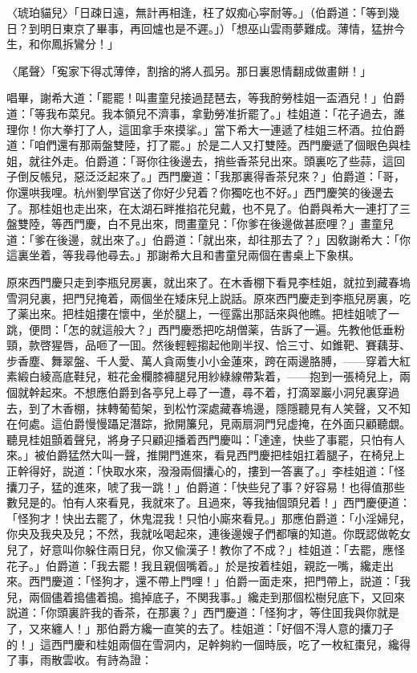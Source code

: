 〈琥珀貓兒〉「日疎日遠，無計再相逢，枉了奴痴心寜耐等。」（伯爵道：「等到幾日？到明日東京了畢事，再回爐也是不遲。」）「想巫山雲雨夢難成。薄情，猛拚今生，和你鳳拆鸞分！」

〈尾聲〉「寃家下得忒薄倖，割捨的將人孤另。那日裏恩情翻成做畫餅！」

唱畢，謝希大道：「罷罷！叫畫童兒接過琵琶去，等我酧勞桂姐一盃酒兒！」伯爵道：「等我布菜兒。我本領兒不濟事，拿勤勞准折罷了。」桂姐道：「花子過去，誰理你！你大拳打了人，這囬拿手來摸挲。」當下希大一連遞了桂姐三杯酒。拉伯爵道：「咱們還有那兩盤雙陸，打了罷。」於是二人又打雙陸。西門慶遞了個眼色與桂姐，就往外走。伯爵道：「哥你往後邊去，捎些香茶兒出來。頭裏吃了些蒜，這回子倒反帳兒，惡泛泛起來了。」西門慶道：「我那裏得香茶兒來？」伯爵道：「哥，你還哄我哩。杭州劉學官送了你好少兒着？你獨吃也不好。」西門慶笑的後邊去了。那桂姐也走出來，在太湖石畔推掐花兒戴，也不見了。伯爵與希大一連打了三盤雙陸，等西門慶，白不見出來，問畫童兒：「你爹在後邊做甚麽哩？」畫童兒道：「爹在後邊，就出來了。」伯爵道：「就出來，却往那去了？」因敎謝希大：「你這裏坐着，等我尋他尋去。」那謝希大且和書童兒兩個在書桌上下象棋。

原來西門慶只走到李瓶兒房裏，就出來了。在木香棚下看見李桂姐，就拉到藏春塢雪洞兒裏，把門兒掩着，兩個坐在矮床兒上説話。原來西門慶走到李瓶兒房裏，吃了薬出來。把桂姐摟在懷中，坐於腿上，一徑露出那話來與他瞧。把桂姐唬了一跳，便問：「怎的就這般大？」西門慶悉把吃胡僧薬，告訴了一遍。先教他低垂粉頸，款啓猩唇，品咂了一囬。然後輕輕搊起他剛半扠、恰三寸、如錐靶、賽藕芽、步香塵、舞翠盤、千人愛、萬人貪兩隻小小金蓮來，跨在兩邊胳膊，——穿着大紅素緞白綾高底鞋兒，粧花金欄膝褲腿兒用紗綠線帶紮着，——抱到一張椅兒上，兩個就幹起來。不想應伯爵到各亭兒上尋了一遭，尋不着，打滴翠巖小洞兒裏穿過去，到了木香棚，抹轉葡萄架，到松竹深處藏春塢邊，隱隱聽見有人笑聲，又不知在何處。這伯爵慢慢躡足潛踪，掀開簾兒，見兩扇洞門兒虚掩，在外面只顧聽覷。聽見桂姐顫着聲兒，將身子只顧迎播着西門慶叫：「達達，快些了事罷，只怕有人來。」被伯爵猛然大叫一聲，推開門進來，看見西門慶把桂姐扛着腿子，在椅兒上正幹得好，説道：「快取水來，潑潑兩個攮心的，摟到一答裏了。」李桂姐道：「怪攮刀子，猛的進來，唬了我一跳！」伯爵道：「快些兒了事？好容易！也得值那些數兒是的。怕有人來看見，我就來了。且過來，等我抽個頭兒着！」西門慶便道：「怪狗才！快出去罷了，休鬼混我！只怕小廝來看見。」那應伯爵道：「小淫婦兒，你央及我央及兒；不然，我就吆喝起來，連後邊嫂子們都嚷的知道。你既認做乾女兒了，好意叫你躲住兩日兒，你又偸漢子！教你了不成？」桂姐道：「去罷，應怪花子。」伯爵道：「我去罷！我且親個嘴着。」於是按着桂姐，親訖一嘴，纔走出來。西門慶道：「怪狗才，還不帶上門哩！」伯爵一面走來，把門帶上，説道：「我兒，兩個儘着搗儘着搗。搗掉底子，不関我事。」纔走到那個松樹兒底下，又回來説道：「你頭裏許我的香茶，在那裏？」西門慶道：「怪狗才，等住囬我與你就是了，又來纏人！」那伯爵方纔一直笑的去了。桂姐道：「好個不淂人意的攮刀子的！」這西門慶和桂姐兩個在雪洞内，足幹夠約一個時辰，吃了一枚紅棗兒，纔得了事，雨散雲收。有詩為證：

